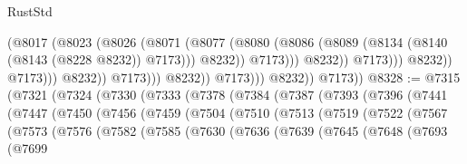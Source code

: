 \begin{lexlean}{RustStd}
\begin{coremodule}
                                                (@8017
                                                  (@8023
                                                    (@8026
                                                      (@8071
                                                        (@8077
                                                          (@8080
                                                            (@8086
                                                              (@8089
                                                                (@8134
                                                                  (@8140
                                                                    (@8143 (@8228 @8232))
                                                                    @7173)))
                                                              @8232))
                                                          @7173)))
                                                    @8232))
                                                @7173)))
                                          @8232))
                                      @7173)))
                                @8232))
                            @7173)))
                      @8232))
                  @7173)))
            @8232))
        @7173))
@8328 := @7315
    (@7321
      (@7324
        (@7330
          (@7333
            (@7378
              (@7384
                (@7387
                  (@7393
                    (@7396
                      (@7441
                        (@7447
                          (@7450
                            (@7456
                              (@7459
                                (@7504
                                  (@7510
                                    (@7513
                                      (@7519
                                        (@7522
                                          (@7567
                                            (@7573
                                              (@7576
                                                (@7582
                                                  (@7585
                                                    (@7630
                                                      (@7636
                                                        (@7639
                                                          (@7645
                                                            (@7648
                                                              (@7693
                                                                (@7699

\end{coremodule}
\end{lexlean}
